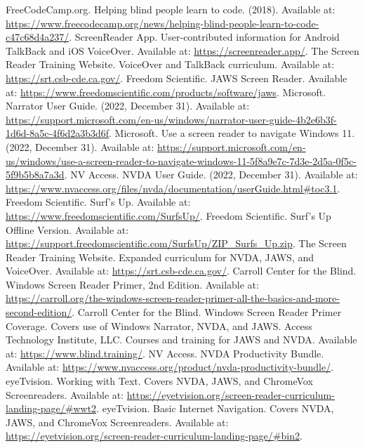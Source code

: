 \begin{thebibliography}{99}
 FreeCodeCamp.org. Helping blind people learn to code. (2018). Available at: \url{https://www.freecodecamp.org/news/helping-blind-people-learn-to-code-c47c68d4a237/}.
 ScreenReader App. User-contributed information for Android TalkBack and iOS VoiceOver. Available at: \url{https://screenreader.app/}.
 The Screen Reader Training Website. VoiceOver and TalkBack curriculum. Available at: \url{https://srt.csb-cde.ca.gov/}.
 Freedom Scientific. JAWS Screen Reader. Available at: \url{https://www.freedomscientific.com/products/software/jaws}.
 Microsoft. Narrator User Guide. (2022, December 31). Available at: \url{https://support.microsoft.com/en-us/windows/narrator-user-guide-4b2e6b3f-1d6d-8a5c-4f6d2a3b3d6f}.
 Microsoft. Use a screen reader to navigate Windows 11. (2022, December 31). Available at: \url{https://support.microsoft.com/en-us/windows/use-a-screen-reader-to-navigate-windows-11-5f8a9e7c-7d3e-2d5a-0f5c-5f9b5b8a7a3d}.
 NV Access. NVDA User Guide. (2022, December 31). Available at: \url{https://www.nvaccess.org/files/nvda/documentation/userGuide.html#toc3.1}.
 Freedom Scientific. Surf's Up. Available at: \url{https://www.freedomscientific.com/SurfsUp/}.
 Freedom Scientific. Surf's Up Offline Version. Available at: \url{https://support.freedomscientific.com/SurfsUp/ZIP_Surfs_Up.zip}.
 The Screen Reader Training Website. Expanded curriculum for NVDA, JAWS, and VoiceOver. Available at: \url{https://srt.csb-cde.ca.gov/}.
 Carroll Center for the Blind. Windows Screen Reader Primer, 2nd Edition. Available at: \url{https://carroll.org/the-windows-screen-reader-primer-all-the-basics-and-more-second-edition/}.
 Carroll Center for the Blind. Windows Screen Reader Primer Coverage. Covers use of Windows Narrator, NVDA, and JAWS.
 Access Technology Institute, LLC. Courses and training for JAWS and NVDA. Available at: \url{https://www.blind.training/}.
 NV Access. NVDA Productivity Bundle. Available at: \url{https://www.nvaccess.org/product/nvda-productivity-bundle/}.
 eyeTvision. Working with Text. Covers NVDA, JAWS, and ChromeVox Screenreaders. Available at: \url{https://eyetvision.org/screen-reader-curriculum-landing-page/#wwt2}.
 eyeTvision. Basic Internet Navigation. Covers NVDA, JAWS, and ChromeVox Screenreaders. Available at: \url{https://eyetvision.org/screen-reader-curriculum-landing-page/#bin2}.

\end{thebibliography}

